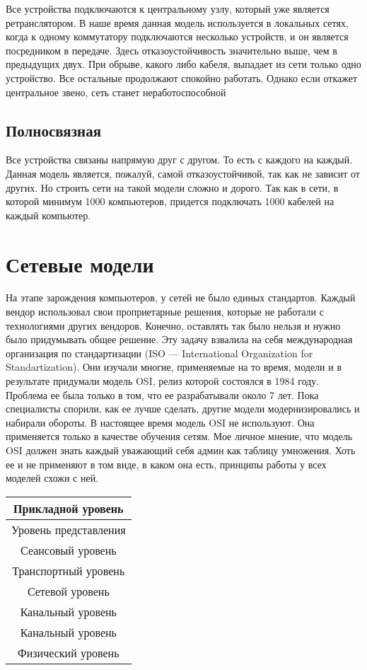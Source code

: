 Все устройства подключаются к центральному узлу, который уже является ретранслятором. В наше время данная модель используется в локальных сетях, когда к одному коммутатору подключаются несколько устройств, и он является посредником в передаче. Здесь отказоустойчивость значительно выше,
чем в предыдущих двух. При обрыве, какого либо кабеля, выпадает из сети
только одно устройство. Все остальные продолжают спокойно работать. Однако если откажет центральное звено, сеть станет неработоспособной

\subsection{Полносвязная}

Все устройства связаны напрямую друг с другом. То есть с каждого на
каждый. Данная модель является, пожалуй, самой отказоустойчивой, так как не
зависит от других. Но строить сети на такой модели сложно и дорого. Так как в
сети, в которой минимум 1000 компьютеров, придется подключать 1000 кабелей на каждый компьютер.

\section{Сетевые модели}

На этапе зарождения компьютеров, у сетей не было единых стандартов.
Каждый вендор использовал свои проприетарные решения, которые не работали с технологиями других вендоров. Конечно, оставлять так было нельзя и нужно было придумывать общее решение. Эту задачу взвалила на себя международная организация по стандартизации (ISO — International Organization for
Standartization). Они изучали многие, применяемые на то время, модели и в
результате придумали модель OSI, релиз которой состоялся в 1984 году. Проблема ее была только в том, что ее разрабатывали около 7 лет. Пока специалисты спорили, как ее лучше сделать, другие модели модернизировались и набирали обороты. В настоящее время модель OSI не используют. Она применяется
только в качестве обучения сетям. Мое личное мнение, что модель OSI должен
знать каждый уважающий себя админ как таблицу умножения. Хоть ее и не
применяют в том виде, в каком она есть, принципы работы у всех моделей
схожи с ней.

\begin{center}
	\begin{tabular}{|c|}
		\hline
		Прикладной уровень \\
		\hline
		Уровень представления \\
		\hline
		Сеансовый уровень \\
		\hline
		Транспортный уровень \\
		\hline
		Сетевой уровень \\
		\hline
		Канальный уровень \\
		\hline
		Канальный уровень \\
		\hline
		Физический уровень \\
		\hline
	\end{tabular}
\end{center}

